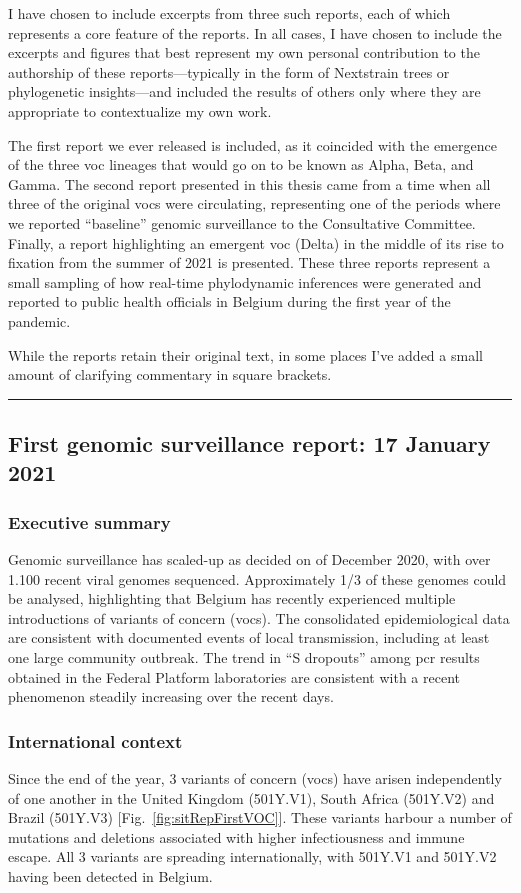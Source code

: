 I have chosen to include excerpts from three such reports, each of which represents a core feature of the reports.
In all cases, I have chosen to include the excerpts and figures that best represent my own personal contribution to the authorship of these reports---typically in the form of Nextstrain trees or phylogenetic insights---and included the results of others only where they are appropriate to contextualize my own work.

The first report we ever released is included, as it coincided with the emergence of the three \gls{voc} lineages that would go on to be known as Alpha, Beta, and Gamma.
The second report presented in this thesis came from a time when all three of the original \gls{voc}s were circulating, representing one of the periods where we reported ``baseline'' genomic surveillance to the Consultative Committee.
Finally, a report highlighting an emergent \gls{voc} (Delta) in the middle of its rise to fixation from the summer of 2021 is presented.
These three reports represent a small sampling of how real-time phylodynamic inferences were generated and reported to public health officials in Belgium during the first year of the pandemic.

While the reports retain their original text, in some places I've added a small amount of clarifying commentary in square brackets.
\vspace*{12pt}
\hrule
\onehalfspacing

\subsection{First genomic surveillance report: 17 January 2021}
\subsubsection{Executive summary}
Genomic surveillance has scaled-up as decided on  of December 2020, with over 1.100 recent viral genomes sequenced. Approximately 1/3 of these genomes could be analysed, highlighting that Belgium has recently experienced multiple introductions of variants of concern (\gls{voc}s). The consolidated epidemiological data are consistent with documented events of local transmission, including at least one large community outbreak.
The trend in ``S dropouts'' among \gls{pcr} results obtained in the Federal Platform laboratories are consistent with a recent phenomenon steadily increasing over the recent days.

\subsubsection{International context}
Since the end of the year, 3 variants of concern (\gls{voc}s) have arisen independently of one another in the United Kingdom (501Y.V1), South Africa (501Y.V2) and Brazil (501Y.V3) [Fig.~\ref{fig:sitRepFirstVOC}].
These variants harbour a number of mutations and deletions associated with higher infectiousness and immune escape.
All 3 variants are spreading internationally, with 501Y.V1 and 501Y.V2 having been detected in Belgium.

